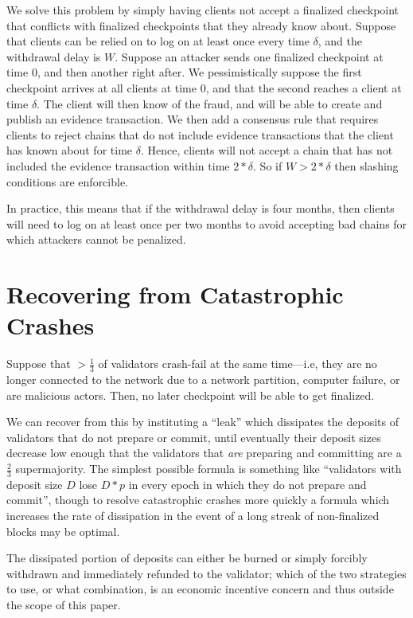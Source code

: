 \documentclass[12pt, final]{article}
\begin{document}
We solve this problem by simply having clients not accept a finalized checkpoint that conflicts with finalized checkpoints that they already know about. Suppose that clients can be relied on to log on at least once every time $\delta$, and the withdrawal delay is $W$. Suppose an attacker sends one finalized checkpoint at time $0$, and then another right after. We pessimistically suppose the first checkpoint arrives at all clients at time $0$, and that the second reaches a client at time $\delta$. The client will then know of the fraud, and will be able to create and publish an evidence transaction. We then add a consensus rule that requires clients to reject chains that do not include evidence transactions that the client has known about for time $\delta$. Hence, clients will not accept a chain that has not included the evidence transaction within time $2 * \delta$. So if $W > 2 * \delta$ then slashing conditions are enforcible.

In practice, this means that if the withdrawal delay is four months, then clients will need to log on at least once per two months to avoid accepting bad chains for which attackers cannot be penalized.

\section{Recovering from Catastrophic Crashes}
\label{sect:leak}

Suppose that $>\frac{1}{3}$ of validators crash-fail at the same time---i.e, they are no longer connected to the network due to a network partition, computer failure, or are malicious actors. Then, no later checkpoint will be able to get finalized.

We can recover from this by instituting a ``leak'' which dissipates the deposits of validators that do not prepare or commit, until eventually their deposit sizes decrease low enough that the validators that \textit{are} preparing and committing are a $\frac{2}{3}$ supermajority. The simplest possible formula is something like ``validators with deposit size $D$ lose $D * p$ in every epoch in which they do not prepare and commit'', though to resolve catastrophic crashes more quickly a formula which increases the rate of dissipation in the event of a long streak of non-finalized blocks may be optimal.

The dissipated portion of deposits can either be burned or simply forcibly withdrawn and immediately refunded to the validator; which of the two strategies to use, or what combination, is an economic incentive concern and thus outside the scope of this paper.
\end{document}
